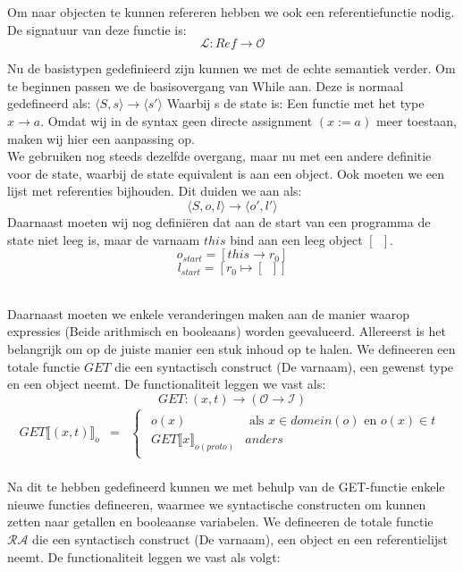 \documentclass[12pt]{article}
\newcommand{\RA}{\mathcal{RA}}
\begin{document}
Om naar objecten te kunnen refereren hebben we ook een referentiefunctie nodig. De signatuur van deze functie is:
$$\mathcal{L} : Ref \rightarrow \mathcal{O}$$

Nu de basistypen gedefinieerd zijn kunnen we met de echte semantiek verder. Om te beginnen passen we de basisovergang van While aan. Deze is normaal gedefineerd als:
$ \langle S,s \rangle \rightarrow \langle s\prime \rangle $
Waarbij s de state is: Een functie met het type
$ x \rightarrow a $.
Omdat wij in de syntax geen directe assignment $(x := a)$ meer toestaan, maken wij hier een aanpassing op.\\
We gebruiken nog steeds dezelfde overgang, maar nu met een andere definitie voor de state, waarbij de state equivalent is aan een object. Ook moeten we een lijst met referenties bijhouden. Dit duiden we aan als:
$$ \langle S,o,l \rangle \rightarrow \langle o\prime, l\prime \rangle $$
Daarnaast moeten wij nog definiëren dat aan de start van een programma de state niet leeg is, maar de varnaam $ this $ bind aan een leeg object $ [\enspace] $.
$$ o_{start} = [this \rightarrow r_0]$$
$$ l_{start} = [r_0 \mapsto [ \enspace ]]$$
\\
\par
Daarnaast moeten we enkele veranderingen maken aan de manier waarop expressies (Beide arithmisch en booleaans) worden geevalueerd. 
Allereerst is het belangrijk om op de juiste manier een stuk inhoud op te halen. We defineeren een totale functie $ GET $ die een syntactisch construct (De varnaam), een gewenst type en een object neemt. De functionaliteit leggen we vast als:
\[ GET: (x,t) \rightarrow (\mathcal{O} \rightarrow \mathcal{I}) \]
\[
\begin{matrix}
GET\llbracket (x,t) \rrbracket_o & = & 
\begin{cases}
\begin{matrix}
o(x) & \mbox{ als } x \in domein(o) \mbox{ en } o(x) \in t\\
GET\llbracket x \rrbracket_{o(proto)} & anders
\end{matrix}
\end{cases}\\
\end{matrix}
\]

Na dit te hebben gedefineerd kunnen we met behulp van de GET-functie enkele nieuwe functies defineeren, waarmee we syntactische constructen om kunnen zetten naar getallen en booleaanse variabelen. We defineeren de totale functie $ \RA $ die een syntactisch construct (De varnaam), een object en een referentielijst neemt. De functionaliteit leggen we vast als volgt:
\end{document}
